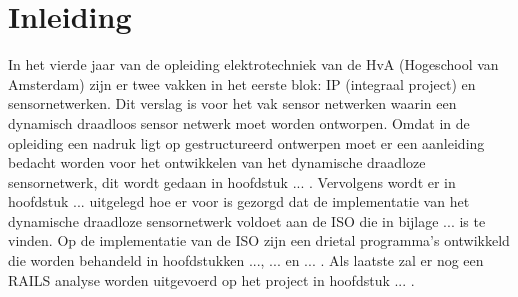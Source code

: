 \section{Inleiding}

In het vierde jaar van de opleiding elektrotechniek van de HvA (Hogeschool van Amsterdam) zijn er twee vakken in het eerste blok: IP (integraal project) en sensornetwerken. Dit verslag is voor het vak sensor netwerken waarin een dynamisch draadloos sensor netwerk moet worden ontworpen. Omdat in de opleiding een nadruk ligt op gestructureerd ontwerpen moet er een aanleiding bedacht worden voor het ontwikkelen van het dynamische draadloze sensornetwerk, dit wordt gedaan in hoofdstuk ... . Vervolgens wordt er in hoofdstuk ... uitgelegd hoe er voor is gezorgd dat de implementatie van het dynamische draadloze sensornetwerk voldoet aan de ISO die in bijlage ...  is te vinden. Op de implementatie van de ISO zijn een drietal programma's ontwikkeld die worden behandeld in hoofdstukken ..., ... en ... . Als laatste zal er nog een RAILS analyse worden uitgevoerd op het project in hoofdstuk ... .